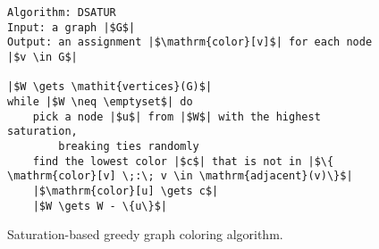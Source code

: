 \documentclass[11pt]{book}
\begin{document}
\begin{figure}[btp]
  \centering
\begin{lstlisting}[basicstyle=\rmfamily,deletekeywords={for,from,with,is,not,in,find},morekeywords={while},columns=fullflexible]
Algorithm: DSATUR
Input: a graph |$G$|
Output: an assignment |$\mathrm{color}[v]$| for each node |$v \in G$|

|$W \gets \mathit{vertices}(G)$|
while |$W \neq \emptyset$| do
    pick a node |$u$| from |$W$| with the highest saturation,
        breaking ties randomly
    find the lowest color |$c$| that is not in |$\{ \mathrm{color}[v] \;:\; v \in \mathrm{adjacent}(v)\}$|
    |$\mathrm{color}[u] \gets c$|
    |$W \gets W - \{u\}$|
\end{lstlisting}
  \caption{Saturation-based greedy graph coloring algorithm.}
  \label{fig:satur-algo}
\end{figure}
\end{document}

